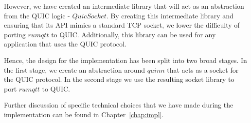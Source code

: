 However, we have created an intermediate library that will act as an abstraction from the QUIC logic - $QuicSocket$.
By creating this intermediate library and ensuring that its API mimics a standard TCP socket, we lower the difficulty of porting $rumqtt$ to QUIC.
Additionally, this library can be used for any application that uses the QUIC protocol.

Hence, the design for the implementation has been split into two broad stages.
In the first stage, we create an abstraction around $quinn$ that acts as a socket for the QUIC protocol.
In the second stage we use the resulting socket library to port $rumqtt$ to QUIC.

Further discussion of specific technical choices that we have made during the implementation can be found in Chapter~\ref{chap:impl}.
